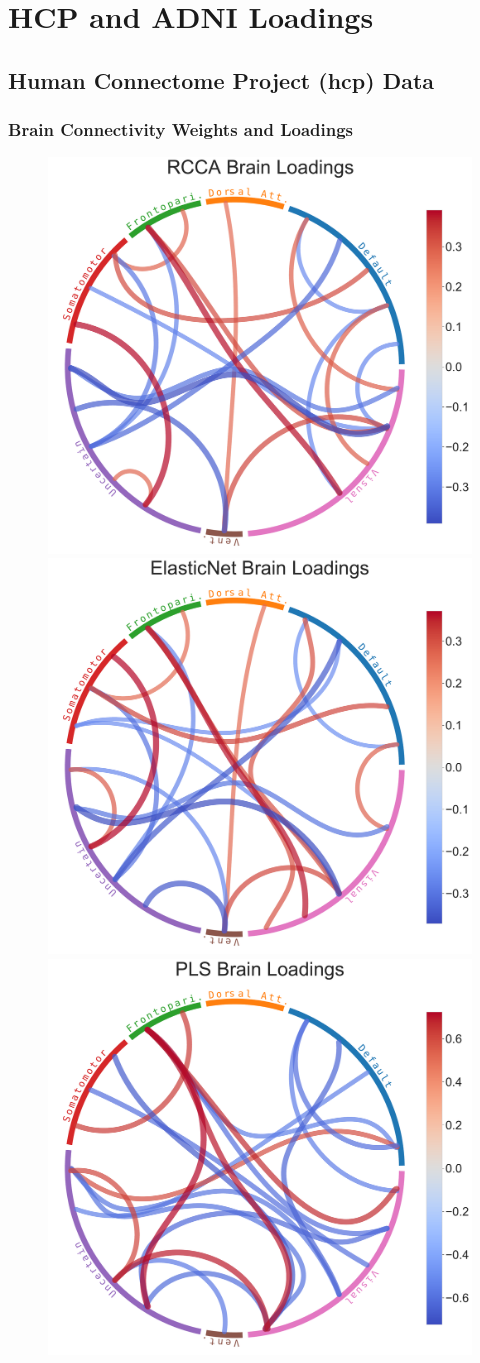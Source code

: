 \chapter{HCP and ADNI Loadings}\label{appendix:loadings}


\section{Human Connectome Project (\acrshort{hcp}) Data}

\subsection{Brain Connectivity Weights and Loadings}

\begin{figure}
    \centering
    \includegraphics[width=0.49\linewidth]{figures/hcp/RCCA brain loadings}
    \includegraphics[width=0.49\linewidth]{figures/hcp/ElasticNet brain loadings}
    \includegraphics[width=0.49\linewidth]{figures/hcp/PLS brain loadings}

\end{figure}
